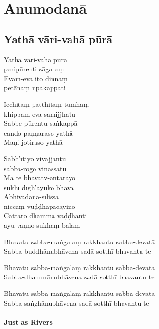 \chapter{Anumodanā}

\section{Yathā vāri-vahā pūrā}


\begin{paritta}
  Yathā vāri-vahā pūrā\\\vin paripūrenti sāgaraṃ\\
  Evam-eva ito dinnaṃ\\\vin petānaṃ upakappati 

  Icchitaṃ patthitaṃ tumhaṃ\\\vin khippam-eva samijjhatu\\
  Sabbe pūrentu saṅkappā\\\vin cando paṇṇaraso yathā\\
  Maṇi jotiraso yathā 


  Sabb'ītiyo vivajjantu\\\vin sabba-rogo vinassatu\\
  Mā te bhavatv-antarāyo\\\vin sukhī dīgh'āyuko bhava\\
  Abhivādana-sīlissa\\\vin niccaṃ vuḍḍhāpacāyino\\
  Cattāro dhammā vaḍḍhanti\\\vin āyu vaṇṇo sukhaṃ balaṃ 
\end{paritta}


Bhavatu sabba-maṅgalaṃ rakkhantu sabba-devatā\\
Sabba-buddhānubhāvena sadā sotthī bhavantu te

Bhavatu sabba-maṅgalaṃ rakkhantu sabba-devatā\\
Sabba-dhammānubhāvena sadā sotthī bhavantu te

Bhavatu sabba-maṅgalaṃ rakkhantu sabba-devatā\\
Sabba-saṅghānubhāvena sadā sotthī bhavantu te

\subsubsection{Just as Rivers}

